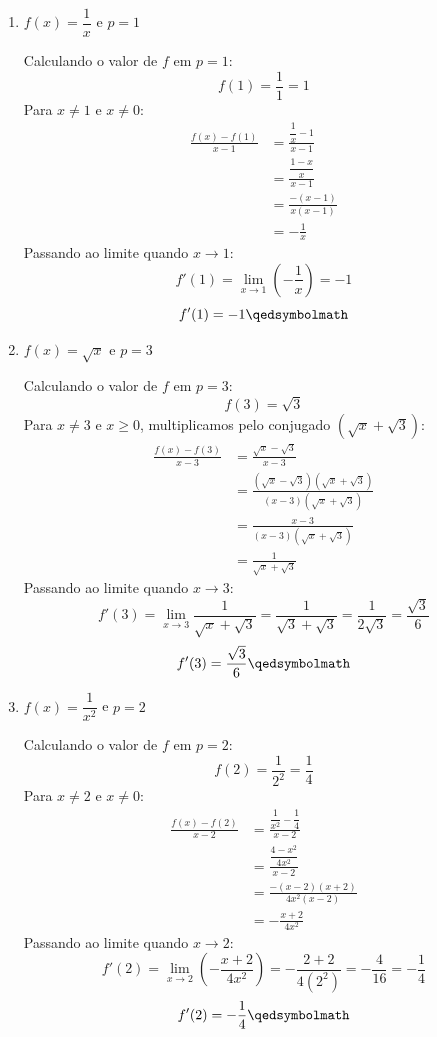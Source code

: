 \begin{enumerate}[label=\alph*)]
    \item $f(x) = \dfrac{1}{x}$ e $p = 1$

    Calculando o valor de $f$ em $p = 1$:
    \[
    f(1) = \frac{1}{1} = 1
    \]
    Para $x \neq 1$ e $x \neq 0$:
    \begin{align*}
        \frac{f(x) - f(1)}{x - 1} &= \frac{\dfrac{1}{x} - 1}{x - 1} \\[0.25cm]
        &= \frac{\dfrac{1 - x}{x}}{x - 1} \\[0.25cm]
        &= \frac{-(x - 1)}{x(x - 1)} \\[0.25cm]
        &= -\frac{1}{x}
    \end{align*}
    Passando ao limite quando $x \to 1$:
    \[
    f'(1) = \lim_{x \to 1} \left(-\frac{1}{x}\right) = -1
    \]
    \[
    f'(1) = -1 \qedsymbolmath
    \]

    \item $f(x) = \sqrt{x}$ e $p = 3$

    Calculando o valor de $f$ em $p = 3$:
    \[
    f(3) = \sqrt{3}
    \]
    Para $x \neq 3$ e $x \ge 0$, multiplicamos pelo conjugado $(\sqrt{x} + \sqrt{3})$:
    \begin{align*}
        \frac{f(x) - f(3)}{x - 3} &= \frac{\sqrt{x} - \sqrt{3}}{x - 3} \\[0.25cm]
        &= \frac{(\sqrt{x} - \sqrt{3})(\sqrt{x} + \sqrt{3})}{(x - 3)(\sqrt{x} + \sqrt{3})} \\[0.25cm]
        &= \frac{x - 3}{(x - 3)(\sqrt{x} + \sqrt{3})} \\[0.25cm]
        &= \frac{1}{\sqrt{x} + \sqrt{3}}
    \end{align*}
    Passando ao limite quando $x \to 3$:
    \[
    f'(3) = \lim_{x \to 3} \frac{1}{\sqrt{x} + \sqrt{3}} = \frac{1}{\sqrt{3} + \sqrt{3}} = \frac{1}{2\sqrt{3}} = \frac{\sqrt{3}}{6}
    \]
    \[
    f'(3) = \frac{\sqrt{3}}{6} \qedsymbolmath
    \]

    \item $f(x) = \dfrac{1}{x^2}$ e $p = 2$

    Calculando o valor de $f$ em $p = 2$:
    \[
    f(2) = \frac{1}{2^2} = \frac{1}{4}
    \]
    Para $x \neq 2$ e $x \neq 0$:
    \begin{align*}
        \frac{f(x) - f(2)}{x - 2} &= \frac{\dfrac{1}{x^2} - \dfrac{1}{4}}{x - 2} \\[0.25cm]
        &= \frac{\dfrac{4 - x^2}{4x^2}}{x - 2} \\[0.25cm]
        &= \frac{-(x - 2)(x + 2)}{4x^2(x - 2)} \\[0.25cm]
        &= -\frac{x + 2}{4x^2}
    \end{align*}
    Passando ao limite quando $x \to 2$:
    \[
    f'(2) = \lim_{x \to 2} \left(-\frac{x + 2}{4x^2}\right) = -\frac{2 + 2}{4(2^2)} = -\frac{4}{16} = -\frac{1}{4}
    \]
    \[
    f'(2) = -\frac{1}{4} \qedsymbolmath
    \]


\end{enumerate}
